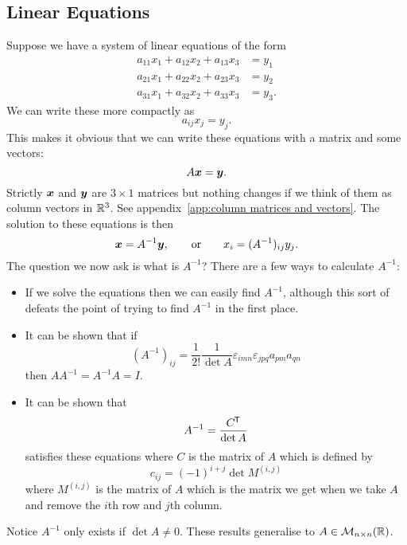 \documentclass[a4paper]{article}
\newcommand{\nxmMatrices}[3]{\mathcal{M}_{{#1}\times{#2}}({#3})}
\begin{document}
    \subsection{Linear Equations}
    Suppose we have a system of linear equations of the form
    \begin{align*}
        a_{11}x_1 + a_{12}x_2 + a_{13}x_3 &= y_1\\
        a_{21}x_1 + a_{22}x_2 + a_{23}x_3 &= y_2\\
        a_{31}x_1 + a_{32}x_2 + a_{33}x_3 &= y_3.
    \end{align*}
    We can write these more compactly as
    \[a_{ij}x_j = y_j.\]
    This makes it obvious that we can write these equations with a matrix and some vectors:
    \[A\bm{x} = \bm{y}.\]
    Strictly \(\bm{x}\) and \(\bm{y}\) are \(3\times 1\) matrices but nothing changes if we think of them as column vectors in \(\mathbb{R}^3\).
    See appendix~\ref{app:column matrices and vectors}.
    The solution to these equations is then
    \[\bm{x} = A^{-1}\bm{y}, \qquad\text{or}\qquad x_i = (A^{-1})_{ij}y_j.\]
    The question we now ask is what is \(A^{-1}\)?
    There are a few ways to calculate \(A^{-1}\):
    \begin{itemize}
        \item If we solve the equations then we can easily find \(A^{-1}\), although this sort of defeats the point of trying to find \(A^{-1}\) in the first place.
        
        \item It can be shown that if
        \[(A^{-1})_{ij} = \frac{1}{2!}\frac{1}{\det A}\varepsilon_{imn}\varepsilon_{jpq}a_{pm}a_{qn}\]
        then \(AA^{-1} = A^{-1}A = I\).
        
        \item It can be shown that
        \[A^{-1} = \frac{C^{\mkern-1.5mu\mathsf{T}}}{\det A}\]
        satisfies these equations where \(C\) is the  matrix of \(A\) which is defined by
        \[c_{ij} = (-1)^{i + j}\det M^{(i, j)}\]
        where \(M^{(i, j)}\) is the  matrix of \(A\) which is the matrix we get when we take \(A\) and remove the \(i\)th row and \(j\)th column.
    \end{itemize}
    Notice \(A^{-1}\) only exists if \(\det A \ne 0\).
    These results generalise to \(A\in\nxmMatrices{n}{n}{\reals}\).
    
\end{document}
